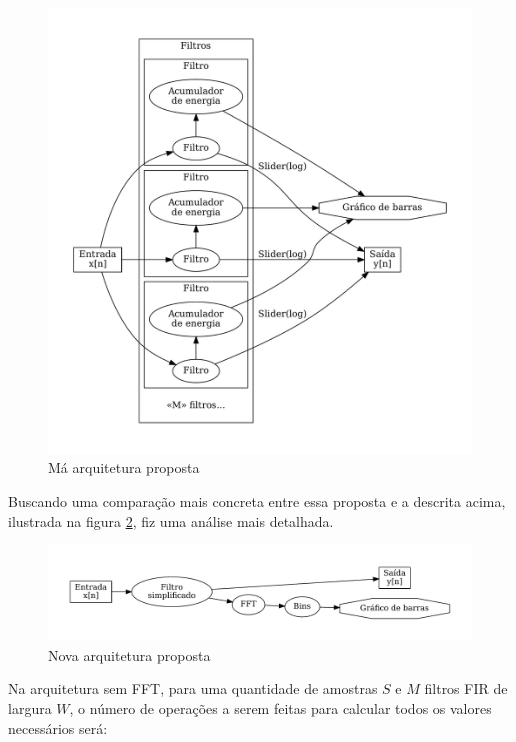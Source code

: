 \begin{figure}[h]
    \centering
    \includegraphics[scale=0.5]{fig/arquitetura.pdf}
    \caption{Má arquitetura proposta}
    \label{fig:arquiteturar}
\end{figure}

\break

Buscando uma comparação mais concreta entre essa proposta e a descrita acima, ilustrada na figura \ref{fig:arquitetura}, fiz uma análise mais detalhada.

\begin{figure}[h]
    \centering
    \includegraphics[scale=0.5]{fig/arquiteturafft.pdf}
    \caption{Nova arquitetura proposta}
    \label{fig:arquitetura}
\end{figure}

Na arquitetura sem FFT, para uma quantidade de amostras $S$ e $M$ filtros FIR de largura $W$, o número de operações a serem feitas para calcular todos os valores necessários será:

